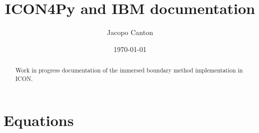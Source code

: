 \documentclass[fleqn]{article}
\title{ICON4Py and IBM documentation}
\author{Jacopo Canton}
\date{\today}
\begin{document}
\maketitle

\begin{abstract}
Work in progress documentation of the immersed boundary method implementation in ICON.
\end{abstract}

\section{Equations}













\end{document}
